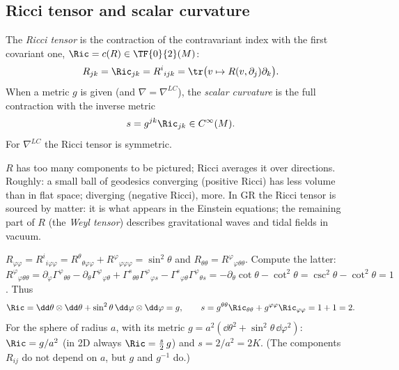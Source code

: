 \subsection{Ricci tensor and scalar curvature}
\begin{formal}
The \emph{Ricci tensor} is the contraction of the contravariant index with the first covariant one, $\Ric=c(R)\in\TF{0}{2}(M)$:
\[
R_{jk}=\Ric_{jk}=R^i{}_{ijk}=\tr\big(v\mapsto R(v,\partial_j)\partial_k\big).
\]
When a metric $g$ is given (and $\nabla=\nabla^{LC}$), the \emph{scalar curvature} is the full contraction with the inverse metric
\[
s=g^{jk}\Ric_{jk}\in C^\infty(M).
\]
For $\nabla^{LC}$ the Ricci tensor is symmetric.
\end{formal}
\begin{intuition}[{Ricci = ``how volumes of small balls differ from flat ones''}]
$R$ has too many components to be pictured; Ricci averages it over directions. Roughly: a small ball of geodesics converging (positive Ricci) has less volume than in flat space; diverging (negative Ricci), more. In GR the Ricci tensor is sourced by matter: it is what appears in the Einstein equations; the remaining part of $R$ (the \emph{Weyl tensor}) describes gravitational waves and tidal fields in vacuum.
\end{intuition}

\begin{example}
$R_{\varphi\varphi}=R^i{}_{i\varphi\varphi}=R^\theta{}_{\theta\varphi\varphi}+R^\varphi{}_{\varphi\varphi\varphi}=\sin^2\theta$ and $R_{\theta\theta}=R^\varphi{}_{\varphi\theta\theta}$. Compute the latter: $R^\varphi{}_{\varphi\theta\theta}=\partial_\varphi\Gamma^\varphi{}_{\theta\theta}-\partial_\theta\Gamma^\varphi{}_{\varphi\theta}+\Gamma^s{}_{\theta\theta}\Gamma^\varphi{}_{\varphi s}-\Gamma^s{}_{\varphi\theta}\Gamma^\varphi{}_{\theta s}=-\partial_\theta\cot\theta-\cot^2\theta=\csc^2\theta-\cot^2\theta=1$. Thus
\[
\Ric=\dd\theta\otimes\dd\theta+\sin^2\theta\,\dd\varphi\otimes\dd\varphi=g,\qquad s=g^{\theta\theta}\Ric_{\theta\theta}+g^{\varphi\varphi}\Ric_{\varphi\varphi}=1+1=2 .
\]
For the sphere of radius $a$, with its metric $g=a^2(\dd\theta^2+\sin^2\theta\,\dd\varphi^2)$: $\Ric=g/a^2$ (in 2D always $\Ric=\tfrac s2\,g$) and $s=2/a^2=2K$. (The components $R_{ij}$ do not depend on $a$, but $g$ and $g^{-1}$ do.)
\end{example}
